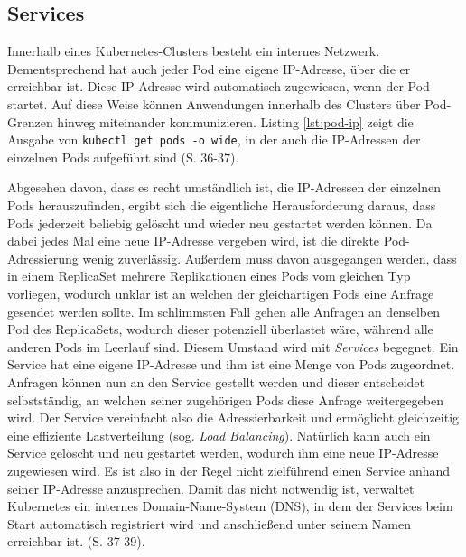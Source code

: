 \documentclass[11pt,a4paper]{article}
\begin{document}
\subsection{Services}
Innerhalb eines Kubernetes-Clusters besteht ein internes Netzwerk. Dementsprechend hat auch jeder Pod
eine eigene IP-Adresse, über die er erreichbar ist. Diese IP-Adresse wird automatisch zugewiesen, wenn der Pod startet.
Auf diese Weise können Anwendungen innerhalb des Clusters über Pod-Grenzen hinweg miteinander kommunizieren.
Listing \ref{lst:pod-ip} zeigt die Ausgabe von \lstinline|kubectl get pods -o wide|, in der auch die IP-Adressen
der einzelnen Pods aufgeführt sind \cite{Schmeling_Dargatz_2022} (S. 36-37).

Abgesehen davon, dass es recht umständlich ist, die IP-Adressen der einzelnen Pods herauszufinden,
ergibt sich die eigentliche Herausforderung daraus, dass Pods jederzeit beliebig gelöscht
und wieder neu gestartet werden können. Da dabei jedes Mal eine neue IP-Adresse vergeben wird,
ist die direkte Pod-Adressierung wenig zuverlässig. Außerdem muss davon ausgegangen werden, dass
in einem ReplicaSet mehrere Replikationen eines Pods vom gleichen Typ vorliegen, wodurch unklar ist
an welchen der gleichartigen Pods eine Anfrage gesendet werden sollte. Im schlimmsten Fall gehen alle Anfragen
an denselben Pod des ReplicaSets, wodurch dieser potenziell überlastet wäre, während alle anderen Pods im Leerlauf sind.
Diesem Umstand wird mit \emph{Services} begegnet. Ein Service hat eine eigene IP-Adresse und ihm ist eine Menge
von Pods zugeordnet. Anfragen können nun an den Service gestellt werden und dieser entscheidet selbstständig,
an welchen seiner zugehörigen Pods diese Anfrage weitergegeben wird. Der Service vereinfacht also die
Adressierbarkeit und ermöglicht gleichzeitig eine effiziente Lastverteilung (sog. \emph{Load Balancing}).
Natürlich kann auch ein Service gelöscht und neu gestartet werden, wodurch ihm eine neue IP-Adresse zugewiesen wird.
Es ist also in der Regel nicht zielführend einen Service anhand seiner IP-Adresse anzusprechen.
Damit das nicht notwendig ist, verwaltet Kubernetes ein internes Domain-Name-System (DNS), in dem
der Services beim Start automatisch registriert wird und anschließend unter seinem Namen
erreichbar ist. \cite{Schmeling_Dargatz_2022} (S. 37-39).
\end{document}
